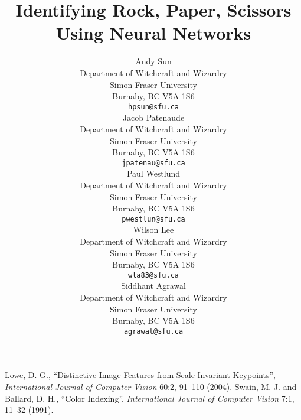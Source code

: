\documentclass{article} %
\title{Identifying Rock, Paper, Scissors Using Neural Networks}
\author{
Andy Sun \\
Department of Witchcraft and Wizardry\\
Simon Fraser University\\
Burnaby, BC V5A 1S6 \\
\texttt{hpsun@sfu.ca} \\
\And
Jacob Patenaude \\
Department of Witchcraft and Wizardry\\
Simon Fraser University\\
Burnaby, BC V5A 1S6 \\
\texttt{jpatenau@sfu.ca} \\
\And
Paul Westlund \\
Department of Witchcraft and Wizardry\\
Simon Fraser University\\
Burnaby, BC V5A 1S6 \\
\texttt{pwestlun@sfu.ca} \\
\And
Wilson Lee \\
Department of Witchcraft and Wizardry\\
Simon Fraser University\\
Burnaby, BC V5A 1S6 \\
\texttt{wla83@sfu.ca} \\
\And
Siddhant Agrawal \\
Department of Witchcraft and Wizardry\\
Simon Fraser University\\
Burnaby, BC V5A 1S6 \\
\texttt{agrawal@sfu.ca} \\
}
\begin{document}
\maketitle

\begin{abstract}

\end{abstract}













\begin{thebibliography}{99}
 Lowe, D. G., ``Distinctive Image Features from Scale-Invariant Keypoints'', \textit{International Journal of Computer Vision} 60:2, 91--110 (2004).
 Swain, M. J. and Ballard, D. H., ``Color Indexing''. \textit{International Journal of Computer Vision} 7:1, 11--32 (1991).
\end{thebibliography}
\end{document}
